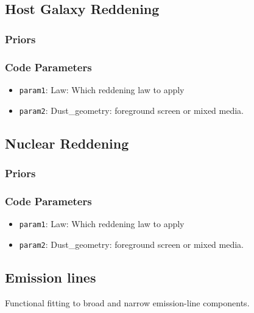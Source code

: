 \documentclass[12pt,letterpaper]{article}
\begin{document}
\subsection*{Host Galaxy Reddening}

\subsubsection*{Priors}
\subsubsection*{Code Parameters}

\begin{itemize}
    \item {\tt param1}: Law: Which reddening law to apply
    \item {\tt param2}: Dust\_geometry: foreground screen or mixed media.
\end{itemize}

\subsection*{Nuclear Reddening}

\subsubsection*{Priors}
\subsubsection*{Code Parameters}

\begin{itemize}
    \item {\tt param1}: Law: Which reddening law to apply
    \item {\tt param2}: Dust\_geometry: foreground screen or mixed media.
\end{itemize}

\subsection*{Emission lines}
Functional fitting to broad and narrow emission-line components.
\end{document}
